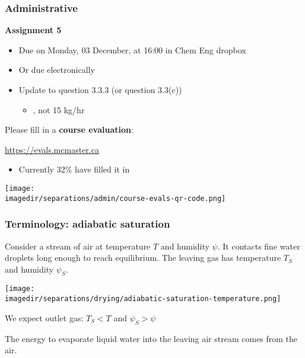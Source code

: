 \begin{frame}\frametitle{Administrative}
	\textbf{Assignment 5}
	\begin{itemize}
		\item	Due on Monday, 03 December, at 16:00 in Chem Eng dropbox
		\item	Or due electronically
		\item	Update to question 3.3.3 (or question 3.3(c))
			\begin{itemize}
				\item	{\color{myRed}{Solvent flow, $S = 27.5$ kg/hr}}, not 15 kg/hr
			\end{itemize}
	\end{itemize}
	\vspace{12pt}
	Please fill in a \textbf{course evaluation}:
	\begin{exampleblock}{}
		\begin{center}
			\href{https://evals.mcmaster.ca}{https://evals.mcmaster.ca}
		\end{center}
	\end{exampleblock}
	\begin{itemize}
		\item	Currently 32\% have filled it in
	\end{itemize}
	\begin{center}
		\texttt{[image: \\imagedir/separations/admin/course-evals-qr-code.png]}
	\end{center}
\end{frame}

\begin{frame}\frametitle{Terminology: adiabatic saturation}
	Consider a stream of air at temperature $T$ and humidity $\psi$. It contacts fine water droplets long enough to reach equilibrium. The leaving gas has temperature $T_S$ and humidity $\psi_S$.

	\begin{center}
		\texttt{[image: \\imagedir/separations/drying/adiabatic-saturation-temperature.png]}
	\end{center}

	We expect outlet gas: $T_S < T$ and $\psi_S > \psi$
	
	\vspace{6pt}
	The energy to evaporate liquid water into the leaving air stream comes from the air.
\end{frame}

